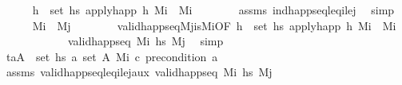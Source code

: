 \begin{isabellebody}
\ \ \ \ \isamarkupfalse%
\ {\isachardoublequoteopen}{\isasymforall}h\ {\isasymin}\ set\ {\isacharquery}{\kern0pt}hs\ apply{\isacharunderscore}{\kern0pt}happ\ h\ M\isactrlsub i\ {\isacharequal}{\kern0pt}\ M\isactrlsub i{\isachardoublequoteclose}\isanewline
\ \ \ \ \ \ \isamarkupfalse%
\ assms\ ind{\isacharunderscore}{\kern0pt}happ{\isacharunderscore}{\kern0pt}seq{\isacharunderscore}{\kern0pt}leq\isactrlsub i{\isacharunderscore}{\kern0pt}le\isactrlsub j\ \isamarkupfalse%
\ simp\isanewline
\ \ \ \ \isamarkupfalse%
\ {\isachardoublequoteopen}M\isactrlsub i\ {\isacharequal}{\kern0pt}\ M\isactrlsub j{\isachardoublequoteclose}\isanewline
\ \ \ \ \ \ \isamarkupfalse%
\ valid{\isacharunderscore}{\kern0pt}happ{\isacharunderscore}{\kern0pt}seq{\isacharunderscore}{\kern0pt}M\isactrlsub j{\isacharunderscore}{\kern0pt}is{\isacharunderscore}{\kern0pt}M\isactrlsub i{\isacharbrackleft}{\kern0pt}OF\ {\isacartoucheopen}{\isasymforall}h\ {\isasymin}\ set\ {\isacharquery}{\kern0pt}hs\ apply{\isacharunderscore}{\kern0pt}happ\ h\ M\isactrlsub i\ {\isacharequal}{\kern0pt}\ M\isactrlsub i{\isacartoucheclose}{\isacharbrackright}{\kern0pt}\ \isanewline
\ \ \ \ \ \ \ \ \ \ \ \ {\isacartoucheopen}valid{\isacharunderscore}{\kern0pt}happ{\isacharunderscore}{\kern0pt}seq\ M\isactrlsub i\ {\isacharquery}{\kern0pt}hs\ M\isactrlsub j{\isacartoucheclose}\ \isamarkupfalse%
\ simp\isanewline
\ \ \ \ \isamarkupfalse%
\ {\isachardoublequoteopen}{\isasymforall}{\isacharparenleft}{\kern0pt}t\isactrlsub a{\isacharcomma}{\kern0pt}A{\isacharparenright}{\kern0pt}\ {\isasymin}\ set\ {\isacharquery}{\kern0pt}hs\ {\isasymforall}a{\isasymin}\ set\ A{\isachardot}{\kern0pt}\ M\isactrlsub i\ \isactrlsup c{\isasymTTurnstile}\isactrlsub {\isacharequal}{\kern0pt}\ precondition\ a{\isachardoublequoteclose}\isanewline
\ \ \ \ \ \ \isamarkupfalse%
\ assms\ valid{\isacharunderscore}{\kern0pt}happ{\isacharunderscore}{\kern0pt}seq{\isacharunderscore}{\kern0pt}leq\isactrlsub i{\isacharunderscore}{\kern0pt}le\isactrlsub j{\isacharunderscore}{\kern0pt}aux{}\ {\isacartoucheopen}valid{\isacharunderscore}{\kern0pt}happ{\isacharunderscore}{\kern0pt}seq\ M\isactrlsub i\ {\isacharquery}{\kern0pt}hs\ M\isactrlsub j{\isacartoucheclose}\ \isamarkupfalse%

\end{isabellebody}
